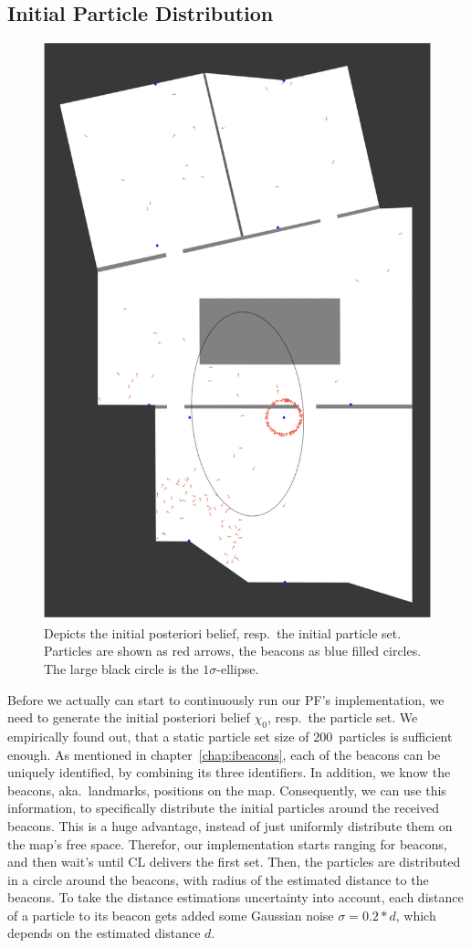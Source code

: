 \subsection{Initial Particle Distribution}\label{sec:algo_initial}

\begin{figure}
\includegraphics[height=0.7\textwidth]{figures/algo_particle_generation}
\caption{Depicts the initial posteriori belief, resp.\ the initial particle set. Particles are shown as red arrows, the beacons as blue filled circles. The large black circle is the $1\sigma$-ellipse.}
\label{fig:pf_initialDist}
\end{figure}

Before we actually can start to continuously run our \acs{PF}'s implementation, we need to generate the initial posteriori belief $\chi_0$, resp.\ the particle set. We empirically found out, that a static particle set size of 200~particles is sufficient enough. As mentioned in chapter~\ref{chap:ibeacons}, each of the beacons can be uniquely identified, by combining its three identifiers. In addition, we know the beacons, aka.\ landmarks, positions on the map. Consequently, we can use this information, to specifically distribute the initial particles around the received beacons. This is a huge advantage, instead of just uniformly distribute them on the map's free space. Therefor, our implementation starts ranging for beacons, and then wait's until \ac{CL} delivers the first set. Then, the particles are distributed in a circle around the beacons, with radius of the estimated distance to the beacons. To take the distance estimations uncertainty into account, each distance of a particle to its beacon gets added some Gaussian noise $\sigma = 0.2 * d$, which depends on the estimated distance $d$. 

